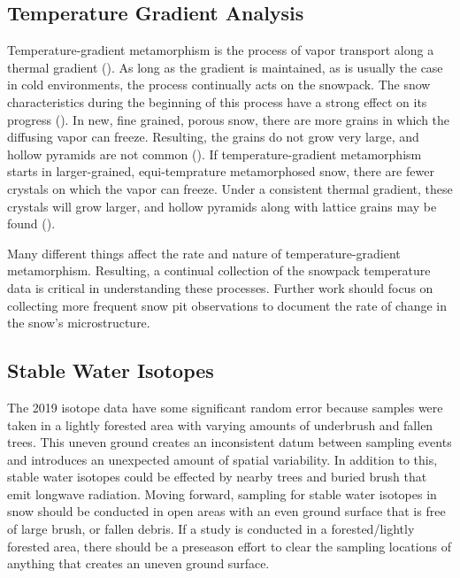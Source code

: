 \subsection{Temperature Gradient Analysis}
Temperature-gradient metamorphism is the process of vapor transport along a thermal gradient (\cite{sommerfeld_1970}). As long as the gradient is maintained, as is usually the case in cold environments, the process continually acts on the snowpack. The snow characteristics during the beginning of this process have a strong effect on its progress (\cite{sommerfeld_1970}). In new, fine grained, porous snow, there are more grains in which the diffusing vapor can freeze. Resulting, the grains do not grow very large, and hollow pyramids are not common (\cite{sommerfeld_1970}). If temperature-gradient metamorphism starts in larger-grained, equi-temprature metamorphosed snow, there are fewer crystals on which the vapor can freeze. Under a consistent thermal gradient, these crystals will grow larger, and hollow pyramids along with lattice grains may be found (\cite{akitaya_1967}). 

Many different things affect the rate and nature of temperature-gradient metamorphism. Resulting, a continual collection of the snowpack temperature data is critical in understanding these processes. Further work should focus on collecting more frequent snow pit observations to document the rate of change in the snow's microstructure. 

\subsection{Stable Water Isotopes}
The 2019 isotope data have some significant random error because samples were taken in a lightly forested area with varying amounts of underbrush and fallen trees. This uneven ground creates an inconsistent datum between sampling events and introduces an unexpected amount of spatial variability. In addition to this, stable water isotopes could be effected by nearby trees and buried brush that emit longwave radiation. Moving forward, sampling for stable water isotopes in snow should be conducted in open areas with an even ground surface that is free of large brush, or fallen debris. If a study is conducted in a forested/lightly forested area, there should be a preseason effort to clear the sampling locations of anything that creates an uneven ground surface. 

